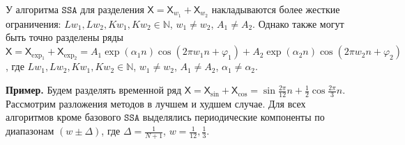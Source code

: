 \documentclass[12pt, specialist, subf
]{disser}
\theoremstyle{definition}
\newcommand{\SSA}{\texttt{SSA}}
\newcommand{\TS}{\mathsf{X}}
\begin{document}
У алгоритма $\SSA$ для разделения $\TS = \TS_{w_1} + \TS_{w_2}$ накладываются более жесткие ограничения:  $Lw_1, Lw_2, Kw_1, Kw_2 \in \mathbb{N}$, $w_1 \not = w_2$, $A_1 \not = A_2$. Однако также могут быть точно разделены ряды $\TS = \TS_{\exp_1} + \TS_{\exp_2} = A_1 \exp(\alpha_1 n)\cos(2\pi w_1 n + \varphi_1) + A_2 \exp(\alpha_2 n)\cos(2\pi w_2 n + \varphi_2)$, где $Lw_1, Lw_2, Kw_1, Kw_2 \in \mathbb{N}$, $w_1 \not = w_2$, $A_1 \not = A_2$, $\alpha_1 \not = \alpha_2$.

\textbf{\large{Пример.}} Будем разделять временной ряд $\TS = \TS_{\sin} + \TS_{\cos} = \sin{\frac{2\pi}{12}n} + \frac{1}{2}\cos{\frac{2\pi}{3}n}$. Рассмотрим разложения методов в лучшем и худшем случае. Для всех алгоритмов кроме базового $\SSA$ выделялись периодические компоненты по диапазонам $\left(w \pm \Delta \right)$, где $\Delta = \frac{1}{N+1}$, $w = \frac{1}{12}, \frac{1}{3}$.
\end{document}
